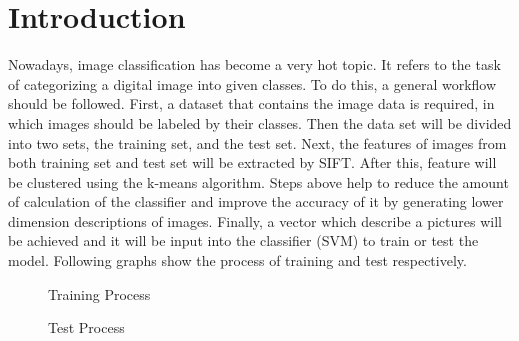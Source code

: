 \section{Introduction}
Nowadays, image classification has become a very hot topic. 
It refers to the task of categorizing a digital image into given classes. 
To do this, a general workflow should be followed.
First, a dataset that contains the image data is required, in which images should be labeled by their classes. 
Then the data set will be divided into two sets, the training set, and the test set.
Next, the features of images from both training set and test set will be extracted by SIFT.
After this, feature will be clustered using the k-means algorithm.
Steps above help to reduce the amount of calculation of the classifier and improve the accuracy of it by generating lower dimension descriptions of images.
Finally, a vector which describe a pictures will be achieved and it will be input into the classifier (SVM) to train or test the model.
Following graphs show the process of training and test respectively.

\begin{figure}[H]
\begin{minipage}[t]{0.5\linewidth}
  \centering
  \caption{Training Process}
  \label{fig:proc:train}

\end{minipage}%
\begin{minipage}[t]{0.5\linewidth}
  \centering
  \caption{Test Process}
  \label{fig:proc:test} %

\end{minipage}
\end{figure}

